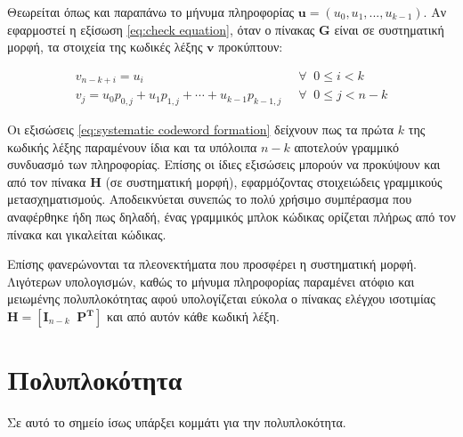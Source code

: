 Θεωρείται όπως και παραπάνω το μήνυμα πληροφορίας $\mathbf{u} = (u_0, u_1, ..., u_{k-1})$. Αν εφαρμοστεί η εξίσωση \ref{eq:check equation}, όταν ο πίνακας $\mathbf{G}$ είναι σε συστηματική μορφή, τα στοιχεία της κωδικές λέξης $\mathbf{v}$ προκύπτουν:

\begin{equation}
\begin{aligned}
v_{n-k+i}=u_i\;\;\ & \forall\;\;0\leq i < k  \\
v_j=u_0p_{0,j}+u_1p_{1,j}+\cdots+u_{k-1}p_{k-1,j}\;\; & \forall\;\;0\leq j < n-k
\end{aligned}
\label{eq:systematic codeword formation}
\end{equation}

Οι εξισώσεις \ref{eq:systematic codeword formation} δείχνουν πως τα πρώτα $k$  της κωδικής λέξης παραμένουν ίδια και τα υπόλοιπα $n-k$ αποτελούν γραμμικό συνδυασμό των  πληροφορίας. Επίσης οι ίδιες εξισώσεις μπορούν να προκύψουν και από τον πίνακα $\mathbf{H}$ (σε συστηματική μορφή), εφαρμόζοντας στοιχειώδεις γραμμικούς μετασχηματισμούς. Αποδεικνύεται συνεπώς το πολύ χρήσιμο συμπέρασμα που αναφέρθηκε ήδη πως δηλαδή, ένας γραμμικός μπλοκ κώδικας ορίζεται πλήρως από τον  πίνακα και γι καλείται  κώδικας.

Επίσης φανερώνονται τα πλεονεκτήματα που προσφέρει η συστηματική μορφή. Λιγότερων υπολογισμών, καθώς το μήνυμα πληροφορίας παραμένει ατόφιο και μειωμένης πολυπλοκότητας αφού υπολογίζεται εύκολα ο πίνακας ελέγχου ισοτιμίας $\mathbf{H}=\left[\mathbf{I}_{n-k}\;\;\mathbf{P^T}\right]$ και από αυτόν κάθε κωδική λέξη.



\section{Πολυπλοκότητα}
Σε αυτό το σημείο ίσως υπάρξει κομμάτι για την πολυπλοκότητα.


